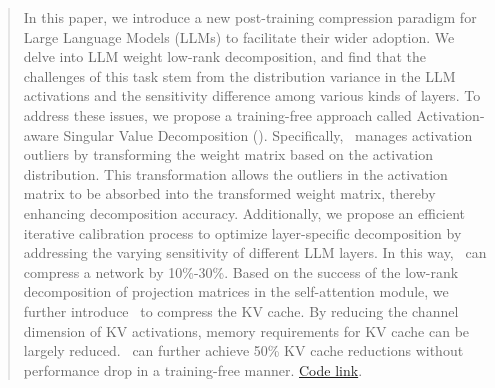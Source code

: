 \begin{abstract}
    In this paper, we introduce a new post-training compression paradigm for Large Language Models (LLMs) to facilitate their wider adoption. We delve into LLM weight low-rank decomposition, and find that the challenges of this task stem from \raisebox{-1.1pt}{\ding[1.1]{182\relax}} the distribution variance in the LLM activations and \raisebox{-1.1pt}{\ding[1.1]{183\relax}} the sensitivity difference among various kinds of layers. 
    To address these issues, we propose a training-free approach called Activation-aware Singular Value Decomposition (\asvd). 
    Specifically, \raisebox{-1.1pt}{\ding[1.1]{182\relax}} \asvd~manages activation outliers by transforming the weight matrix based on the activation distribution. 
    This transformation allows the outliers in the activation matrix to be absorbed into the transformed weight matrix, thereby enhancing decomposition accuracy.
    \raisebox{-1.1pt}{\ding[1.1]{183\relax}} Additionally, we propose an efficient iterative calibration process to optimize layer-specific decomposition by addressing the varying sensitivity of different LLM layers. 
    In this way, \asvd~can compress a network by 10\%-30\%.
    Based on the success of the low-rank decomposition of projection matrices in the self-attention module, we further introduce \asvd~to compress the KV cache. 
    By reducing the channel dimension of KV activations, memory requirements for KV cache can be largely reduced. 
    \asvd~can further achieve 50\% KV cache reductions without performance drop in a training-free manner.
    \href{https://github.com/hahnyuan/ASVD4LLM}{Code link}.
\end{abstract}